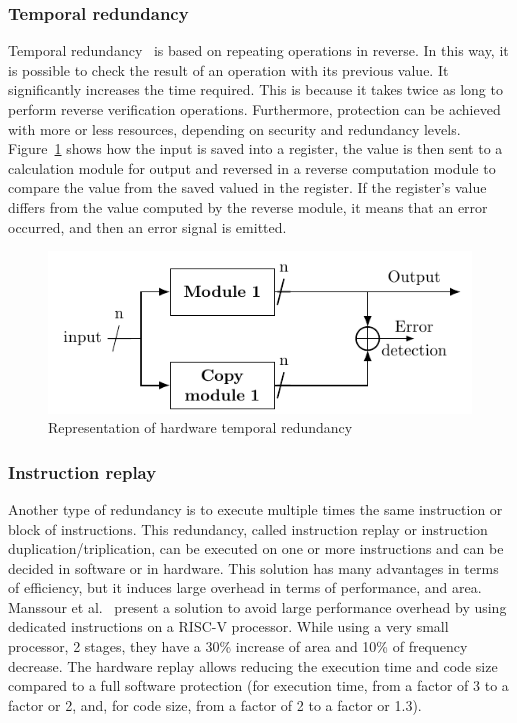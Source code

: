 \subsubsection{Temporal redundancy}
Temporal redundancy~\cite{RBMK-10-host, MVL-07-fdtc, GK-13-tcad}  is based on repeating operations in reverse. In this way, it is possible to check the result of an operation with its previous value. It significantly increases the time required. This is because it takes twice as long to perform reverse verification operations. Furthermore, protection can be achieved with more or less resources, depending on security and redundancy levels. Figure~\ref{fig:temporal_redundancy} shows how the input is saved into a register, the value is then sent to a calculation module for output and reversed in a reverse computation module to compare the value from the saved valued in the register. If the register's value differs from the value computed by the reverse module, it means that an error occurred, and then an error signal is emitted.

\begin{figure}[ht]
    \centering
    \includegraphics[page=2]{c2_soa/img/redundancy.pdf}
    \caption{Representation of hardware temporal redundancy}
    \label{fig:temporal_redundancy}
\end{figure}

\subsubsection{Instruction replay}
Another type of redundancy is to execute multiple times the same instruction or block of instructions. This redundancy, called instruction replay or instruction duplication/triplication, can be executed on one or more instructions and can be decided in software or in hardware. This solution has many advantages in terms of efficiency, but it induces large overhead in terms of performance, and area.
Manssour et al.~\cite{NLGT-22-ddecs} present a solution to avoid large performance overhead by using dedicated instructions on a RISC-V processor. While using a very small processor, 2 stages, they have a 30\% increase of area and 10\% of frequency decrease. The hardware replay allows reducing the execution time and code size compared to a full software protection (for execution time, from a factor of 3 to a factor or 2, and, for code size, from a factor of 2 to a factor or 1.3).

